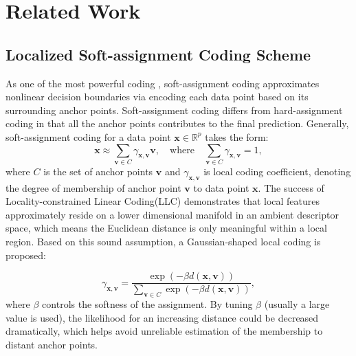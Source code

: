 \documentclass{llncs}
\def \x {\mathbf{x}}
\def \v {\mathbf{v}}
\begin{document}
	\section{Related Work}
	\subsection{Localized Soft-assignment Coding Scheme}
	As one of the most powerful coding , soft-assignment coding approximates nonlinear decision boundaries via encoding each data point based on its surrounding anchor points. Soft-assignment coding differs from hard-assignment coding in that all the anchor points contributes to the final prediction. Generally, soft-assignment coding for a data point $\x \in \mathbb{R}^p$ takes the form:
	\begin{equation}
	\x \approx \sum_{\v \in C}\gamma_{\x,\v}\v,\quad \mbox{where} \quad \sum_{\v \in C}\gamma_{\x,\v}=1,
	\end{equation}
	where $C$ is the set of anchor points $\v$ and $\gamma_{\x,\v}$ is local coding coefficient, denoting the degree of membership of anchor point $\v$ to data point $\x$. 
	The success of Locality-constrained Linear Coding(LLC) \cite{11} \cite{12} demonstrates that local features approximately reside on a lower dimensional manifold in an ambient descriptor space, which means the Euclidean distance is only meaningful within a local region. Based on this sound assumption, a Gaussian-shaped local coding  \cite{9} \cite{10} is proposed:
	
	\begin{equation}
	\gamma_{\x,\v} = 
	\frac{\exp(-\beta d(\x, \v))}{\sum_{\v \in C}\exp(-\beta d(\x,\v))},
	\end{equation}
	where $\beta$ controls the softness of the assignment. By tuning $\beta$ (usually a large value is used), the likelihood for an increasing distance could be decreased dramatically, which helps avoid unreliable estimation of the membership to distant anchor points. 
	
\end{document}
